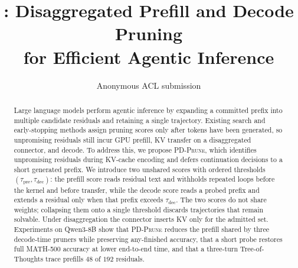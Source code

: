 \documentclass[11pt]{article}
\title{\sys{}: Disaggregated Prefill and Decode Pruning\\ for Efficient Agentic Inference}
\author{Anonymous ACL submission}
\newcommand{\sys}{\mbox{\textsc{PD-Prune}}\xspace}
\begin{document}
\maketitle

\begin{abstract}
Large language models perform agentic inference by expanding a committed prefix into multiple candidate residuals and retaining a single trajectory.
Existing search and early-stopping methods assign pruning scores only after tokens have been generated, so unpromising residuals still incur GPU prefill, KV transfer on a disaggregated connector, and decode.
To address this, we propose \sys, which identifies unpromising residuals during KV-cache encoding and defers continuation decisions to a short generated prefix.
We introduce two unshared scores with ordered thresholds $(\tau_{\mathrm{pre}}, \tau_{\mathrm{dec}})$: the prefill score reads residual text and withholds repeated loops before the kernel and before transfer, while the decode score reads a probed prefix and extends a residual only when that prefix exceeds $\tau_{\mathrm{dec}}$.
The two scores do not share weights; collapsing them onto a single threshold discards trajectories that remain solvable.
Under disaggregation the connector inserts KV only for the admitted set.
Experiments on Qwen3-8B show that \sys reduces the prefill shared by three decode-time pruners while preserving any-finished accuracy, that a short probe restores full MATH-500 accuracy at lower end-to-end time, and that a three-turn Tree-of-Thoughts trace prefills $48$ of $192$ residuals.
\end{abstract}










\end{document}

